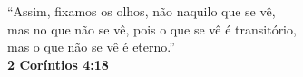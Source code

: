 {\fontsize{10pt}{12pt}\selectfont
\begin{flushright}
    “Assim, fixamos os olhos, não naquilo que se vê, \\
    mas no que não se vê, pois o que se vê é transitório, \\
    mas o que não se vê é eterno.” \\
    \vspace{0.2cm}
    \textbf{2 Coríntios 4:18}
\end{flushright}
}